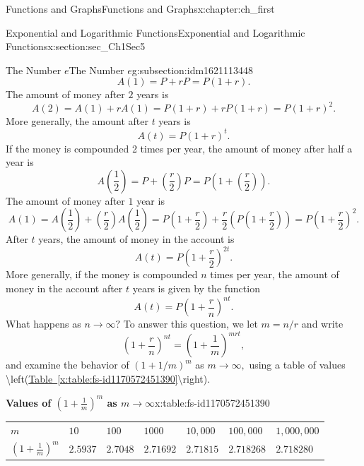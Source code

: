 \documentclass[oneside,10pt,]{book}
\newcommand{\tabularfont}{\relax}
\newcommand{\xreffont}{\relax}
\numberwithin{equation}{section}
\begin{document}
\begin{chapterptx}{Functions and Graphs}{}{Functions and Graphs}{}{}{x:chapter:ch_first}
\begin{sectionptx}{Exponential and Logarithmic Functions}{}{Exponential and Logarithmic Functions}{}{}{x:section:sec_Ch1Sec5}
\begin{subsectionptx}{The Number \(e \)}{}{The Number \(e \)}{}{}{g:subsection:idm1621113448}
\begin{equation*}
A(1)=P+rP=P(1+r).
\end{equation*}
The amount of money after \(2\) years is%
%
\begin{equation*}
A(2)=A(1)+rA(1)=P(1+r)+rP(1+r)=P(1+r)^2.
\end{equation*}
More generally, the amount after \(t\) years is%
%
\begin{equation*}
A(t)=P(1+r)^t.
\end{equation*}
If the money is compounded 2 times per year, the amount of money after half a year is%
%
\begin{equation*}
A\left(\frac{1}{2}\right)=P+\left(\frac{r}{2}\right)P=P\left(1+\left(\frac{r}{2}\right)\right).
\end{equation*}
The amount of money after \(1\) year is%
%
\begin{equation*}
A\left(1\right)=A\left(\frac{1}{2}\right)+\left(\frac{r}{2}\right)A\left(\frac{1}{2}\right)=P\left(1+\frac{r}{2}\right)+\frac{r}{2}\left(P\left(1+\frac{r}{2}\right)\right)=P\left(1+\frac{r}{2}\right)^2.
\end{equation*}
After \(t\) years, the amount of money in the account is%
%
\begin{equation*}
A\left(t\right)=P\left(1+\frac{r}{2}\right)^{2t}.
\end{equation*}
More generally, if the money is compounded \(n\) times per year, the amount of money in the account after \(t\) years is given by the function%
%
\begin{equation*}
A\left(t\right)=P\left(1+\frac{r}{n}\right)^{nt}.
\end{equation*}
What happens as \(n\to \infty?\) To answer this question, we let \(m=n/r\) and write%
%
\begin{equation*}
\left(1+ \frac{r}{n}\right)^{nt}=\left(1+ \frac{1}{m}\right)^{mrt},
\end{equation*}
and examine the behavior of \(\left(1+1/m\right)^m\) as \(m\to \infty,\) using a table of values \textbackslash{}left(\hyperref[x:table:fs-id1170572451390]{Table~{\xreffont\ref{x:table:fs-id1170572451390}}}\textbackslash{}right).%
\begin{tableptx}{\textbf{Values of \(\left(1+ \frac{1}{m}\right)^m\) as \(m\to \infty\)}}{x:table:fs-id1170572451390}{}%
\centering%
{\tabularfont%
\begin{tabular}{lllllll}
\(m\)&\(10\)&\(100\)&\(1000\)&\(10,000\)&\(100,000\)&\(1,000,000\)\tabularnewline[0pt]
\(\left(1+ \frac{1}{m}\right)^m\)&\(2.5937\)&\(2.7048\)&\(2.71692\)&\(2.71815\)&\(2.718268\)&\(2.718280\)
\end{tabular}
}
\end{tableptx}
\end{subsectionptx}
\end{sectionptx}
\end{chapterptx}
\end{document}
